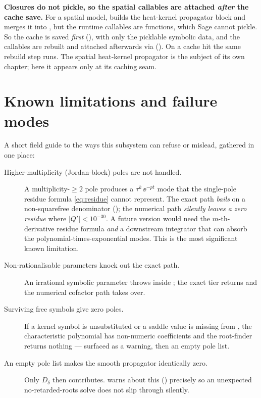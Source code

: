 \begin{gotcha}
\textbf{Closures do not pickle, so the spatial  callables are attached
\emph{after} the cache save.} For a spatial model,  builds
the heat-kernel propagator block and merges it into , but the runtime
callables  are functions, which Sage cannot pickle. So the cache is
saved \emph{first} (), with only the picklable
symbolic data, and the  callables are rebuilt and attached afterwards
via  (). On a cache
hit the same rebuild step runs. The spatial heat-kernel propagator is the subject
of its own chapter; here it appears only at its caching seam.
\end{gotcha}

\section{Known limitations and failure modes}

A short field guide to the ways this subsystem can refuse or mislead, gathered in
one place:

\begin{description}
  \item[Higher-multiplicity (Jordan-block) poles are not handled.] A
        multiplicity-$\ge 2$ pole produces a $\tau^k\,\ee^{-pt}$ mode that the
        single-pole residue formula \eqref{eq:residue} cannot represent. The exact
        path \emph{bails} on a non-squarefree denominator
        (); the numerical path \emph{silently
        leaves a zero residue} where $|Q'| < 10^{-30}$. A future version would need
        the $m$-th-derivative residue formula \emph{and} a downstream integrator
        that can absorb the polynomial-times-exponential modes. This is the most
        significant known limitation.
  \item[Non-rationalisable parameters knock out the exact path.] An irrational
        symbolic parameter throws inside ; the exact
        tier returns  and the numerical cofactor path takes over.
  \item[Surviving free symbols give zero poles.] If a kernel symbol is
        unsubstituted or a saddle value is missing from , the
        characteristic polynomial has non-numeric coefficients and the root-finder
        returns nothing --- surfaced as a warning, then an empty pole list.
  \item[An empty pole list makes the smooth propagator identically zero.] Only
        $D_\delta$ then contributes.  warns about this
        () precisely so an unexpected
        no-retarded-roots solve does not slip through silently.
\end{description}

